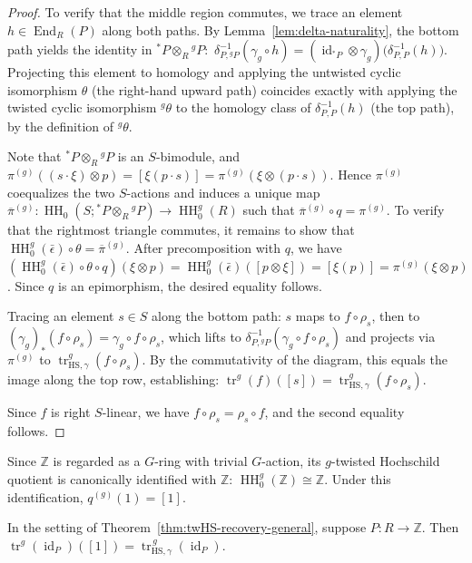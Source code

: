 \documentclass[11pt,oneside]{amsart}
\DeclareMathOperator{\HH}{HH}
\DeclareMathOperator{\End}{End}
\DeclareMathOperator{\id}{id}
\numberwithin{equation}{section}
\numberwithin{figure}{section}
\theoremstyle{plain}
\theoremstyle{definition}
\theoremstyle{remark}
\begin{document}
\begin{proof}
 To verify that the middle region commutes, we trace an element $h \in \End_R(P)$ along both paths. By Lemma~\ref{lem:delta-naturality}, the bottom path yields the identity  in \({}^*P \otimes_R {}^gP:\)
 \(\delta^{-1}_{P,{}^gP}(\gamma_g \circ h) = (\id_{{}^*P} \otimes \gamma_g)\bigl(\delta^{-1}_{P,P}(h)\bigr). 
\)
Projecting this element to homology and applying the untwisted cyclic isomorphism $\theta$ (the right-hand upward path) coincides exactly with applying the twisted cyclic isomorphism ${}^g\theta$ to the homology class of $\delta^{-1}_{P,P}(h)$ (the top path), by the  definition of ${}^g\theta$.

Note that \({}^*P\otimes_R{}^gP\) is an \(S\)-bimodule, and \(\pi^{(g)}((s\cdot\xi)\otimes p) = [\xi(p\cdot s)] = \pi^{(g)}(\xi\otimes(p\cdot s))\). Hence \(\pi^{(g)}\) coequalizes the two \(S\)-actions and induces a unique map \(\overline{\pi}^{(g)}\colon \HH_0(S;{}^*P\otimes_R{}^gP)\to\HH_0^g(R)\) such that \(\overline{\pi}^{(g)}\circ q=\pi^{(g)}\). To verify that the rightmost triangle commutes, it remains to show that \(\HH_0^g(\bar\epsilon)\circ\theta=\overline{\pi}^{(g)}\). After precomposition with \(q\), we have \((\HH_0^g(\bar\epsilon)\circ\theta\circ q)(\xi\otimes p) = \HH_0^g(\bar\epsilon)([p\otimes\xi]) = [\xi(p)] = \pi^{(g)}(\xi\otimes p)\). Since \(q\) is an epimorphism, the desired equality follows.

Tracing an element $s \in S$ along the bottom path: $s$ maps to $f\circ \rho_s$, then to $(\gamma_g)_*(f\circ \rho_s) = \gamma_g \circ f\circ \rho_s$, which lifts to $\delta^{-1}_{P,{}^gP}(\gamma_g \circ f\circ \rho_s)$ and projects via $\pi^{(g)}$ to $\operatorname{tr}_{\mathrm{HS},\gamma}^{g}(f\circ \rho_s)$. By the commutativity of the diagram, this equals the image along the top row, establishing:
\(
\operatorname{tr}^g(f)([s]) = \operatorname{tr}_{\mathrm{HS},\gamma}^{g}(f\circ \rho_s).
\)


Since $f$ is right $S$-linear, we have $f\circ \rho_s=\rho_s\circ f$, and the
second equality follows.
\end{proof}


Since \(\mathbb Z\) is regarded as a \(G\)-ring with trivial \(G\)-action, its
\(g\)-twisted Hochschild quotient is canonically identified with \(\mathbb Z\):
\(
\HH_0^g(\mathbb Z)\cong \mathbb Z.
\)
Under this identification, \(q^{(g)}(1)=[1]\).



\begin{cor}\label{cor:twHS-recovery-Z}
In the setting of Theorem~\ref{thm:twHS-recovery-general}, suppose
$P\colon R\to \mathbb Z$. Then
\(
\operatorname{tr}^g(\id_P)([1])
=
\operatorname{tr}_{\mathrm{HS},\gamma}^{\,g}(\id_P).
\)
\end{cor}
\end{document}
